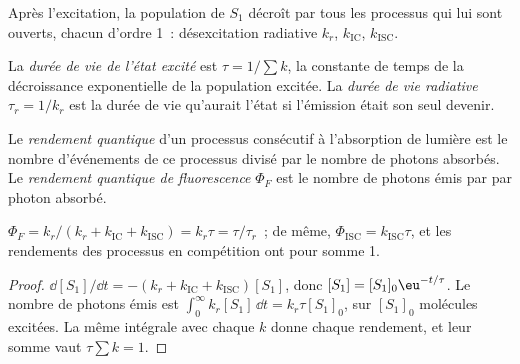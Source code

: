 Après l'excitation, la population de $S_1$ décroît par tous les processus
qui lui sont ouverts, chacun d'ordre 1~: désexcitation radiative $k_r$,
 $k_{\mathrm{IC}}$,
 $k_{\mathrm{ISC}}$.

\begin{definition}\label{def:b3:electronic-spectroscopy:lifetime}
La \emph{durée de vie de l'état excité} est $\tau =
1/\sum k$, la constante de temps de la décroissance exponentielle de la
population excitée. La \emph{durée de vie radiative} $\tau_r =
1/k_r$ est la durée de vie qu'aurait l'état si l'émission était son seul
devenir.
\end{definition}

\begin{definition}\label{def:b3:electronic-spectroscopy:quantum-yield}
Le \emph{rendement quantique} d'un processus
consécutif à l'absorption de lumière est le nombre d'événements de ce
processus divisé par le nombre de photons absorbés. Le \emph{rendement
quantique de fluorescence} $\Phi_F$ est le
nombre de photons émis par  par photon absorbé.
\end{definition}

\begin{proposition}\label{prop:b3:electronic-spectroscopy:quantum-yield}
$\Phi_F = k_r/(k_r + k_{\mathrm{IC}} + k_{\mathrm{ISC}}) = k_r\tau = \tau/\tau_r$~; de même,
$\Phi_{\mathrm{ISC}} = k_{\mathrm{ISC}}\tau$, et les rendements des
processus en compétition ont pour somme 1.
\end{proposition}

\begin{proof}
$\dd[S_1]/\dd t = -(k_r + k_{\mathrm{IC}} + k_{\mathrm{ISC}})[S_1]$, donc $[S_1] = [S_1]_0\eu^{-t/\tau}$.
Le nombre de photons émis est $\int_0^\infty k_r[S_1]\,\dd t = k_r\tau[S_1]_0$, sur
$[S_1]_0$ molécules excitées. La même intégrale avec chaque $k$ donne
chaque rendement, et leur somme vaut $\tau\sum k = 1$.
\end{proof}


